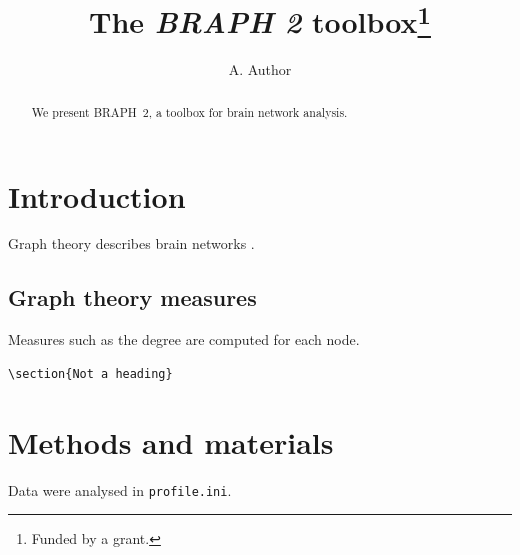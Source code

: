 \documentclass{article}
\title{The \emph{BRAPH 2} toolbox\thanks{Funded by a grant.}}
\author{A. Author}
\newcommand{\braph}{BRAPH~2}
\begin{document}
\maketitle
\begin{abstract}
We present \braph{}, a toolbox for brain network analysis.
\end{abstract}

\section{Introduction}\label{sec:intro}
Graph theory describes brain networks \cite{rubinov10}.

\subsection*{Graph \textbf{theory} measures}
Measures such as the degree are computed for each node.
\begin{verbatim}
\section{Not a heading}
\end{verbatim}

\section[Methods]{Methods and
  materials}
Data were analysed in \texttt{profile.ini}.
\end{document}
